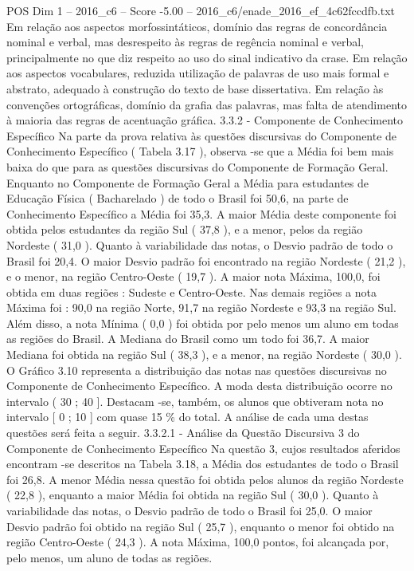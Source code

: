 \begin{textsample}{POS Dim 1 – 2016\_c6 – Score -5.00 – 2016\_c6/enade\_2016\_ef\_4c62fccdfb.txt}
Em relação aos aspectos morfossintáticos, domínio das regras de concordância nominal e verbal, mas desrespeito às regras de regência nominal e verbal, principalmente no que diz respeito ao uso do sinal indicativo da crase.
Em relação aos aspectos vocabulares, reduzida utilização de palavras de uso mais formal e abstrato, adequado à construção do texto de base dissertativa.
Em relação às convenções ortográficas, domínio da grafia das palavras, mas falta de atendimento à maioria das regras de acentuação gráfica. 3.3.2 - Componente de Conhecimento Específico Na parte da prova relativa às questões discursivas do Componente de Conhecimento Específico ( Tabela 3.17 ), observa -se que a Média foi bem mais baixa do que para as questões discursivas do Componente de Formação Geral.
Enquanto no Componente de Formação Geral a Média para estudantes de Educação Física ( Bacharelado ) de todo o Brasil foi 50,6, na parte de Conhecimento Específico a Média foi 35,3.
A maior Média deste componente foi obtida pelos estudantes da região Sul ( 37,8 ), e a menor, pelos da região Nordeste ( 31,0 ).
Quanto à variabilidade das notas, o Desvio padrão de todo o Brasil foi 20,4.
O maior Desvio padrão foi encontrado na região Nordeste ( 21,2 ), e o menor, na região Centro-Oeste ( 19,7 ).
A maior nota Máxima, 100,0, foi obtida em duas regiões : Sudeste e Centro-Oeste.
Nas demais regiões a nota Máxima foi : 90,0 na região Norte, 91,7 na região Nordeste e 93,3 na região Sul.
Além disso, a nota Mínima ( 0,0 ) foi obtida por pelo menos um aluno em todas as regiões do Brasil.
A Mediana do Brasil como um todo foi 36,7.
A maior Mediana foi obtida na região Sul ( 38,3 ), e a menor, na região Nordeste ( 30,0 ).
O Gráfico 3.10 representa a distribuição das notas nas questões discursivas no Componente de Conhecimento Específico.
A moda desta distribuição ocorre no intervalo ( 30 ; 40 ].
Destacam -se, também, os alunos que obtiveram nota no intervalo [ 0 ; 10 ] com quase 15 \% do total.
A análise de cada uma destas questões será feita a seguir. 3.3.2.1 - Análise da Questão Discursiva 3 do Componente de Conhecimento Específico Na questão 3, cujos resultados aferidos encontram -se descritos na Tabela 3.18, a Média dos estudantes de todo o Brasil foi 26,8.
A menor Média nessa questão foi obtida pelos alunos da região Nordeste ( 22,8 ), enquanto a maior Média foi obtida na região Sul ( 30,0 ).
Quanto à variabilidade das notas, o Desvio padrão de todo o Brasil foi 25,0.
O maior Desvio padrão foi obtido na região Sul ( 25,7 ), enquanto o menor foi obtido na região Centro-Oeste ( 24,3 ).
A nota Máxima, 100,0 pontos, foi alcançada por, pelo menos, um aluno de todas as regiões.

\end{textsample}
